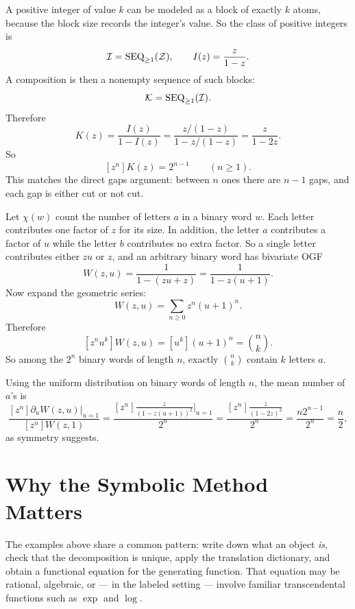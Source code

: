 \begin{example}
A positive integer of value $k$ can be modeled as a block of exactly $k$ atoms, because the block size records the integer's value. So the class of positive integers is
\[
  \mathcal{I} = \operatorname{SEQ}_{\ge 1}(\mathcal{Z}),
  \qquad
  I(z) = \frac{z}{1-z}.
\]
A composition is then a nonempty sequence of such blocks:
\[
  \mathcal{K} = \operatorname{SEQ}_{\ge 1}(\mathcal{I}).
\]
Therefore
\[
  K(z) = \frac{I(z)}{1-I(z)} = \frac{z/(1-z)}{1-z/(1-z)} = \frac{z}{1-2z}.
\]
So
\[
  [z^n]K(z) = 2^{n-1} \qquad (n \ge 1).
\]
This matches the direct gaps argument: between $n$ ones there are $n-1$ gaps, and each gap is either cut or not cut.
\end{example}

\begin{example}
Let $\chi(w)$ count the number of letters $a$ in a binary word $w$. Each letter contributes one factor of $z$ for its size. In addition, the letter $a$ contributes a factor of $u$ while the letter $b$ contributes no extra factor. So a single letter contributes either $zu$ or $z$, and an arbitrary binary word has bivariate OGF
\[
  W(z,u) = \frac{1}{1-(zu+z)} = \frac{1}{1-z(u+1)}.
\]
Now expand the geometric series:
\[
  W(z,u) = \sum_{n \ge 0} z^n (u+1)^n.
\]
Therefore
\[
  [z^n u^k]W(z,u) = [u^k](u+1)^n = \binom{n}{k}.
\]
So among the $2^n$ binary words of length $n$, exactly $\binom{n}{k}$ contain $k$ letters $a$.

Using the uniform distribution on binary words of length $n$, the mean number of $a$'s is
\[
  \frac{[z^n]\partial_u W(z,u)\big|_{u=1}}{[z^n]W(z,1)}
  = \frac{[z^n]\frac{z}{(1-z(u+1))^2}\big|_{u=1}}{2^n}
  = \frac{[z^n]\frac{z}{(1-2z)^2}}{2^n}
  = \frac{n2^{n-1}}{2^n}
  = \frac{n}{2},
\]
as symmetry suggests.
\end{example}

\section{Why the Symbolic Method Matters}

The examples above share a common pattern: write down what an object \emph{is}, check that the decomposition is unique, apply the translation dictionary, and obtain a functional equation for the generating function. That equation may be rational, algebraic, or --- in the labeled setting --- involve familiar transcendental functions such as $\exp$ and $\log$.

